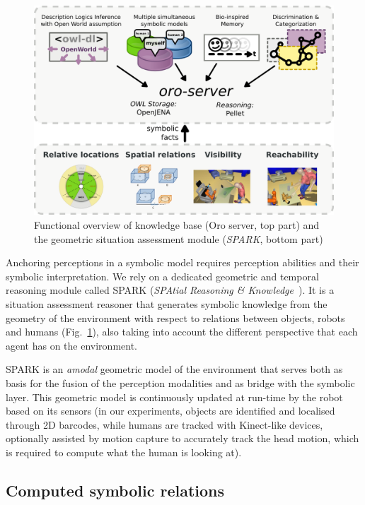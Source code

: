 \documentclass[letterpaper, 10 pt, conference]{ieeeconf}  %
\begin{document}
\begin{figure}
        \centering
        \includegraphics[width=\columnwidth]{spark-oro}
    \caption{Functional overview of knowledge base ({\sc Oro} server, top part) and the geometric situation assessment module (\emph{SPARK}, bottom part)}
        \label{fig|spark-oro}
\end{figure}

Anchoring perceptions in a symbolic model requires perception abilities and
their symbolic interpretation. We rely on a dedicated geometric and temporal
reasoning module called SPARK (\emph{SPAtial Reasoning \&
Knowledge}~\cite{Sisbot2011}). It is a situation assessment reasoner that
generates symbolic knowledge from the geometry of the environment with respect
to relations between objects, robots and humans (Fig.~\ref{fig|spark-oro}),
also taking into account the different perspective that each agent has on the
environment.

SPARK is an \emph{amodal} geometric model of the environment that serves both
as basis for the fusion of the perception modalities and as bridge with the
symbolic layer. This geometric model is continuously updated at run-time by the
robot based on its sensors (in our experiments, objects are identified and
localised through 2D barcodes, while humans are tracked with Kinect-like
devices, optionally assisted by motion capture to accurately track the head
motion, which is required to compute what the human is looking at).

\subsection{Computed symbolic relations}
\end{document}
